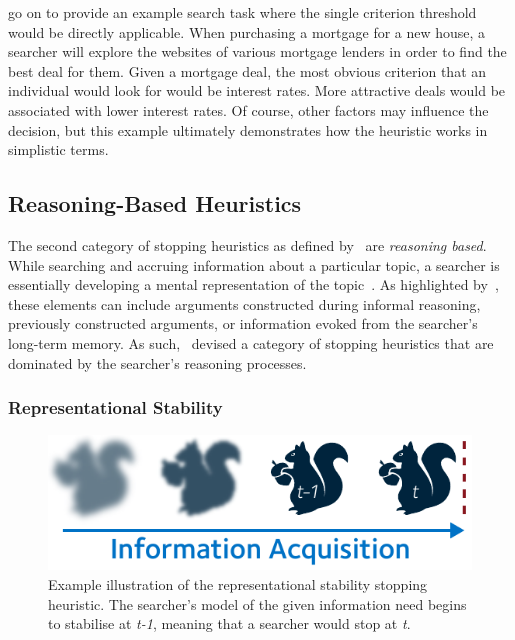 \cite{browne2005stopping_rules} go on to provide an example search task where the single criterion threshold would be directly applicable. When purchasing a mortgage for a new house, a searcher will explore the websites of various mortgage lenders in order to find the best deal for them. Given a mortgage deal, the most obvious criterion that an individual would look for would be interest rates. More attractive deals would be associated with lower interest rates. Of course, other factors may influence the decision, but this example ultimately demonstrates how the heuristic works in simplistic terms.

\subsection{Reasoning-Based Heuristics}\label{sec:stopping_background:heuristics:reasoning}
The second category of stopping heuristics as defined by~\cite{nickles1995judgment} are \emph{reasoning based}. While searching and accruing information about a particular topic, a searcher is essentially developing a mental representation of the topic~\citep{yates1990decision_making}. As highlighted by~\cite{nickles1995judgment}, these elements can include arguments constructed during informal reasoning, previously constructed arguments, or information evoked from the searcher's long-term memory. As such,~\cite{nickles1995judgment} devised a category of stopping heuristics that are dominated by the searcher's reasoning processes.

\subsubsection{Representational Stability}\label{sec:stopping_background:heuristics:representational}
\begin{figure}
    \begin{center}
    \vspace*{-11mm}
    \includegraphics[width=1\textwidth]{figures/ch3-representational.pdf}
    \end{center}
    \vspace*{-5mm}
    \caption[Representational stability stopping heuristic]{Example illustration of the representational stability stopping heuristic. The searcher's model of the given information need begins to stabilise at \emph{t-1}, meaning that a searcher would stop at \emph{t}.}
    \label{fig:representational_heuristic}
\end{figure}

